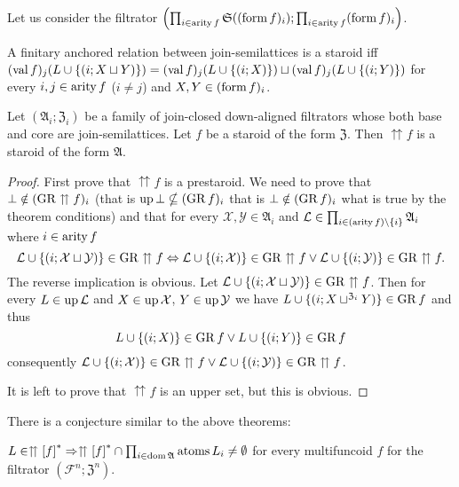 Let us consider the filtrator $\left(\prod_{i\in\operatorname{arity} f}\mathfrak{S}((\operatorname{form} f)_{i});\prod_{i\in\operatorname{arity} f}(\operatorname{form} f)_{i}\right)$.
\begin{conjecture}
A finitary anchored relation between join-semilattices is a staroid
iff $(\operatorname{val} f)_{j}(L\cup\{(i;X\sqcup Y)\})=(\operatorname{val} f)_{j}(L\cup\{(i;X)\})\sqcup(\operatorname{val} f)_{j}(L\cup\{(i;Y)\})$
for every $i,j\in\operatorname{arity} f$ ($i\ne j$) and $X,Y\in(\operatorname{form} f)_{i}$.\end{conjecture}
\begin{thm}
\label{upg-is-strd}Let $(\mathfrak{A}_{i};\mathfrak{Z}_{i})$ be
a family of join-closed down-aligned filtrators whose both base and
core are join-semilattices. Let $f$ be a staroid of the form $\mathfrak{Z}$.
Then $\upuparrows f$ is a staroid of the form $\mathfrak{A}$.\end{thm}
\begin{proof}
First prove that $\upuparrows f$ is a prestaroid. We need to prove
that $\bot\notin(\operatorname{GR}\upuparrows f)_{i}$ (that is $\operatorname{up}\bot\nsubseteq(\operatorname{GR} f)_{i}$
that is $\bot\notin(\operatorname{GR} f)_{i}$ what is true by the theorem conditions)
and that for every $\mathcal{X},\mathcal{Y}\in\mathfrak{A}_{i}$ and
$\mathcal{L}\in\prod_{i\in(\operatorname{arity} f)\setminus\{i\}}\mathfrak{A}_{i}$
where $i\in\operatorname{arity} f$
\[
\mathcal{L}\cup\{(i;\mathcal{X}\sqcup\mathcal{Y})\}\in\operatorname{GR}\upuparrows f\Leftrightarrow\mathcal{L}\cup\{(i;\mathcal{X})\}\in\operatorname{GR}\upuparrows f\vee\mathcal{L}\cup\{(i;\mathcal{Y})\}\in\operatorname{GR}\upuparrows f.
\]
The reverse implication is obvious. Let $\mathcal{L}\cup\{(i;\mathcal{X}\sqcup\mathcal{Y})\}\in\operatorname{GR}\upuparrows f$.
Then for every $L\in\operatorname{up}\mathcal{L}$ and $X\in\operatorname{up}\mathcal{X}$, $Y\in\operatorname{up}\mathcal{Y}$
we have
$L\cup\{(i;X\sqcup^{\mathfrak{Z}_{i}}Y)\}\in\operatorname{GR} f$ and thus
\[
L\cup\{(i;X)\}\in\operatorname{GR} f\vee L\cup\{(i;Y)\}\in\operatorname{GR} f
\]
consequently $\mathcal{L}\cup\{(i;\mathcal{X})\}\in\operatorname{GR}\upuparrows f\vee\mathcal{L}\cup\{(i;\mathcal{Y})\}\in\operatorname{GR}\upuparrows f$.

It is left to prove that $\upuparrows f$ is an upper set, but this
is obvious.
\end{proof}
There is a conjecture similar to the above theorems:
\begin{conjecture}
\label{strd-rel-atoms}$L\in\upuparrows\mathord{\mathrel{\left[f\right]^{\ast}}}\Rightarrow\upuparrows\mathord{\mathrel{\left[f\right]^{\ast}}}\cap\prod_{i\in\operatorname{dom}\mathfrak{A}}\operatorname{atoms} L_{i}\neq\emptyset$
for every multifuncoid $f$ for the filtrator $(\mathscr{F}^{n};\mathfrak{Z}^{n})$.
\end{conjecture}

